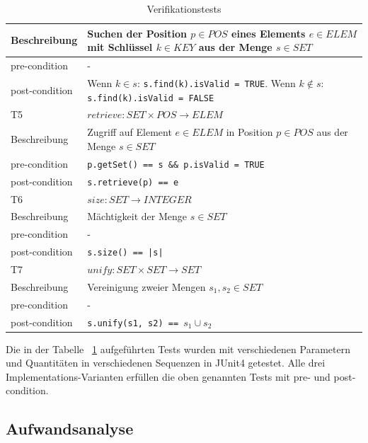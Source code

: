 \documentclass[11pt]{scrartcl}
\begin{document}
\begin{table}
\begin{tabular}[ht]{|l|p{12cm}|}
Beschreibung  & Suchen der Position \(p \in POS\) eines Elements \(e \in ELEM\) mit Schlüssel \(k \in KEY\) aus der Menge \(s \in SET\)           \\ \hline
pre-condition  & -           \\ \hline
post-condition & Wenn \(k \in s\): \texttt{s.find(k).isValid = TRUE}. Wenn \(k \notin s\): \texttt{s.find(k).isValid = FALSE}           \\ \hline
\hline
T5             & \(retrieve : SET \times POS \to ELEM\) \\ \hline
Beschreibung  & Zugriff auf Element \(e \in ELEM\) in Position \(p \in POS\) aus der Menge \(s \in SET\)           \\ \hline
pre-condition  & \texttt{p.getSet() == s \&\& p.isValid = TRUE}           \\ \hline
post-condition & \texttt{s.retrieve(p) == e}           \\ \hline
\hline
T6             & \(size : SET \to INTEGER\) \\ \hline
Beschreibung  & Mächtigkeit der Menge \(s \in SET\)           \\ \hline
pre-condition  & -           \\ \hline
post-condition & \texttt{s.size() == |s|}           \\ \hline
\hline
T7             & \(unify : SET \times SET \to SET\) \\ \hline
Beschreibung  & Vereinigung zweier Mengen \(s_{1},s_{2} \in SET\)           \\ \hline
pre-condition  & -           \\ \hline
post-condition & \texttt{s.unify(s1, s2) == }\(s_{1} \cup s_{2}\)           \\ \hline
\end{tabular}
\caption{Verifikationstests}
\label{table:vertests}
\end{table}

Die in der Tabelle ~\ref{table:vertests} aufgeführten Tests wurden mit verschiedenen Parametern und Quantitäten in verschiedenen Sequenzen in JUnit4 getestet. 
Alle drei Implementations-Varianten erfüllen die oben genannten Tests mit pre- und post-condition.

\subsection{Aufwandsanalyse}
\label{sec:aufwand}
\end{document}
